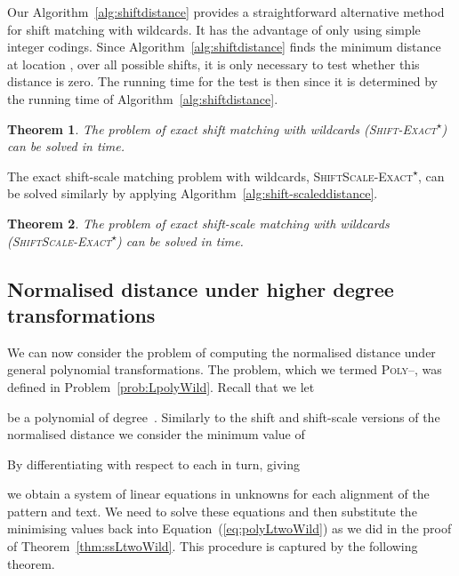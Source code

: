 \documentclass[11pt]{article}
\newcommand{\wildcard}{\ensuremath{\star}\xspace}
\newcommand{\sExactWild}{\textsc{Shift-Exact\textsuperscript{\wildcard}}\xspace}
\newcommand{\ssExactWild}{\textsc{ShiftScale-Exact\textsuperscript{\wildcard}}\xspace}
\newcommand{\LpolyWild}{\textsc{Poly--}\xspace}
\theoremstyle{plain}
\newtheorem{theorem}{Theorem}[]
\theoremstyle{definition}
\begin{document}
Our Algorithm~\ref{alg:shiftdistance} provides a straightforward alternative method for shift matching with wildcards.  It has the advantage of only using simple integer codings.  Since Algorithm~\ref{alg:shiftdistance} finds the minimum  distance at location , over all possible shifts, it is only necessary to test whether this distance is zero.  The running time for the test is then  since it is determined by the running time of Algorithm~\ref{alg:shiftdistance}.

\begin{theorem}
    \label{thm:sExactWild}
    The problem of exact shift matching with wildcards (\sExactWild) can be solved in  time.
\end{theorem}

The exact shift-scale matching problem with wildcards, \ssExactWild, can be solved similarly by applying Algorithm~\ref{alg:shift-scaleddistance}.

\begin{theorem}
    \label{thm:ssExactWild}
    The problem of exact shift-scale matching with wildcards (\ssExactWild) can be solved in  time.
\end{theorem}


\subsection{Normalised  distance under higher degree transformations}

We can now consider the problem of computing the normalised  distance under general polynomial transformations. The problem, which we termed \LpolyWild, was defined in Problem~\ref{prob:LpolyWild}. Recall that we let

be a polynomial of degree~.
Similarly to the shift and shift-scale versions of the normalised  distance we consider the minimum value of

By differentiating with respect to each  in turn, giving

we obtain a system of  linear equations in  unknowns for each alignment  of the pattern and text. We need to solve these equations and then substitute the minimising  values back into Equation~(\ref{eq:polyLtwoWild}) as we did in the proof of Theorem~\ref{thm:ssLtwoWild}. This procedure is captured by the following theorem.
\end{document}
